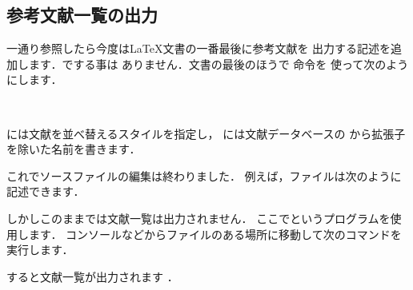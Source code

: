 \subsection{参考文献一覧の出力}

%

一通り参照したら今度は{\LaTeX}文書の一番最後に参考文献を
出力する記述を追加します．でする事は
ありません．文書の最後のほうで  命令を
使って次のようにします．%
\begin{Syntax}
\\
\end{Syntax}
には文献を並べ替えるスタイルを指定し，
には文献データベースの
から拡張子を除いた名前を書きます．

これでソースファイルの編集は終わりました．
例えば，ファイルは次のように記述できます．
しかしこのままでは文献一覧は出力されません．
ここで{\JBibTeX}というプログラムを使用します．
コンソールなどからファイルのある場所に移動して次のコマンドを実行します．
\begin{InTerm}
  
  
  
  
\end{InTerm}
すると文献一覧が出力されます%
．

